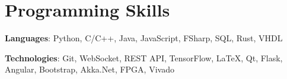                     \section{Programming Skills}
                    \resumeSubHeadingListStart
                    \item{
                        \textbf{Languages}{: Python, C/C++, Java, JavaScript, FSharp, SQL, Rust, VHDL} 
                    }
                    \item{
                        \textbf{Technologies}{: Git, WebSocket, REST API, TensorFlow, \LaTeX, Qt, Flask, Angular, Bootstrap, Akka.Net, FPGA, Vivado}
                    }
                    \resumeSubHeadingListEnd
